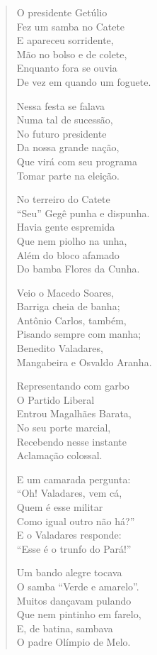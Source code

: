 \begin{verse}
O presidente Getúlio\\
Fez um samba no Catete\\
E apareceu sorridente,\\
Mão no bolso e de colete,\\
Enquanto fora se ouvia\\
De vez em quando um foguete.

Nessa festa se falava\\
Numa tal de sucessão,\\
No futuro presidente\\
Da nossa grande nação,\\
Que virá com seu programa\\
Tomar parte na eleição.

No terreiro do Catete\\
“Seu” Gegê punha e dispunha.\\
Havia gente espremida\\
Que nem piolho na unha,\\
Além do bloco afamado\\
Do bamba Flores da Cunha.
\pagebreak

Veio o Macedo Soares,\\
Barriga cheia de banha;\\
Antônio Carlos, também,\\
Pisando sempre com manha;\\
Benedito Valadares,\\
Mangabeira e Osvaldo Aranha.

Representando com garbo\\
O Partido Liberal\\
Entrou Magalhães Barata,\\
No seu porte marcial,\\
Recebendo nesse instante\\
Aclamação colossal.

E um camarada pergunta:\\
“Oh! Valadares, vem cá,\\
Quem é esse militar\\
Como igual outro não há?”\\
E o Valadares responde:\\
“Esse é o trunfo do Pará!”

Um bando alegre tocava\\
O samba “Verde e amarelo”.\\
Muitos dançavam pulando\\
Que nem pintinho em farelo,\\
E, de batina, sambava\\
O padre Olímpio de Melo.
\pagebreak


\end{verse}
